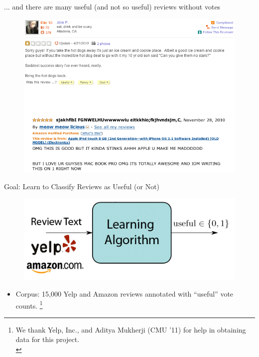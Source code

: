 \documentclass{beamer}
\begin{document}
\begin{frame}{... and there are many useful (and not so useful) reviews without votes}
\begin{figure}[h]
  \centering
  \includegraphics[scale=.4]{review_unvoted}
  \label{fig:unvoted}
\end{figure}
\end{frame}

\begin{frame}{Goal: Learn to Classify Reviews as Useful (or Not)}
\begin{figure}[h]
  \centering
  \includegraphics[scale=.4]{learning_summary}
  \label{fig:summary}
\end{figure}
\begin{itemize}
\item Corpus: 15,000 Yelp and Amazon reviews annotated with ``useful'' vote counts. \footnote{{\tiny We thank Yelp, Inc., and Aditya Mukherji (CMU '11) for help in obtaining data for this project.}\\}
\end{itemize}
\end{frame}
\end{document}
